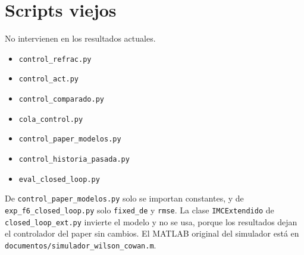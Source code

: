 \documentclass[10pt,a4paper]{article}
\begin{document}
\section*{Scripts viejos}
\sloppy
No intervienen en los resultados actuales.
\begin{itemize}\setlength{\itemsep}{0pt}
\item \texttt{control\_refrac.py}
\item \texttt{control\_act.py}
\item \texttt{control\_comparado.py}
\item \texttt{cola\_control.py}
\item \texttt{control\_paper\_modelos.py}
\item \texttt{control\_historia\_pasada.py}
\item \texttt{eval\_closed\_loop.py}
\end{itemize}
De \texttt{control\_paper\_modelos.py} solo se importan constantes, y de \texttt{exp\_f6\_closed\_loop.py} solo \texttt{fixed\_de} y \texttt{rmse}. La clase \texttt{IMCExtendido} de \texttt{closed\_loop\_ext.py} invierte el modelo y no se usa, porque los resultados dejan el controlador del paper sin cambios. El MATLAB original del simulador está en \texttt{documentos/simulador\_wilson\_cowan.m}.
\end{document}
